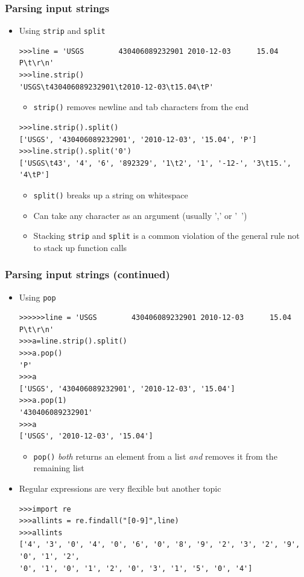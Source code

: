 \documentclass{beamer}
\begin{document}
\begin{frame}[fragile]
\frametitle{Parsing input strings}
\begin{itemize}
\item Using \texttt{strip} and \texttt{split}
\begin{lstlisting}
>>>line = 'USGS        430406089232901 2010-12-03      15.04   P\t\r\n'
>>>line.strip()
'USGS\t430406089232901\t2010-12-03\t15.04\tP'
\end{lstlisting}
\begin{itemize} 
\item \texttt{strip()} removes newline and tab characters from the end 
\end{itemize}
\begin{lstlisting}
>>>line.strip().split()
['USGS', '430406089232901', '2010-12-03', '15.04', 'P']
>>>line.strip().split('0')
['USGS\t43', '4', '6', '892329', '1\t2', '1', '-12-', '3\t15.', '4\tP']
\end{lstlisting}
\begin{itemize} 
\item \texttt{split()} breaks up a string on whitespace 
\item Can take any character as an argument (usually ',' or '~') 
\item Stacking \texttt{strip} and \texttt{split} is a common violation of the general rule not to stack up function calls
\end{itemize}
\end{itemize}
\end{frame}

\begin{frame}[fragile]
\frametitle{Parsing input strings (continued)}
\begin{itemize}
\item Using \texttt{pop}
\begin{lstlisting}
>>>>>>line = 'USGS        430406089232901 2010-12-03      15.04   P\t\r\n'
>>>a=line.strip().split()
>>>a.pop()
'P'
>>>a
['USGS', '430406089232901', '2010-12-03', '15.04']
>>>a.pop(1)
'430406089232901'
>>>a
['USGS', '2010-12-03', '15.04']
\end{lstlisting}
\begin{itemize} 
\item \texttt{pop()} \emph{both} returns an element from a list \emph{and} removes it from the remaining list
\end{itemize}
\item Regular expressions are very flexible but another topic 
\begin{lstlisting}
>>>import re
>>>allints = re.findall("[0-9]",line)
>>>allints
['4', '3', '0', '4', '0', '6', '0', '8', '9', '2', '3', '2', '9', '0', '1', '2', 
'0', '1', '0', '1', '2', '0', '3', '1', '5', '0', '4']

\end{lstlisting}

\end{itemize}
\end{frame}
\end{document}
